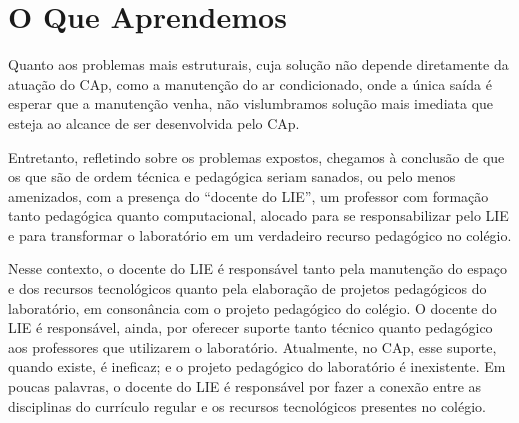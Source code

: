 \section{O Que Aprendemos}\label{sec:LABEL_CHP_REL_SEC_CONC}

Quanto aos problemas mais estruturais, cuja solução não depende diretamente da atuação do CAp, como a manutenção do ar condicionado, onde a única saída é esperar que a manutenção venha, não vislumbramos solução mais imediata que esteja ao alcance de ser desenvolvida pelo CAp.

Entretanto, refletindo sobre os problemas expostos, chegamos à conclusão de que os que são de ordem técnica e pedagógica seriam sanados, ou pelo menos amenizados, com a presença do “docente do LIE”, um professor com formação tanto pedagógica quanto computacional, alocado para se responsabilizar pelo LIE e para transformar o laboratório em um verdadeiro recurso pedagógico no colégio.

Nesse contexto, o docente do LIE é responsável tanto pela manutenção do espaço e dos recursos tecnológicos quanto pela elaboração de projetos pedagógicos do laboratório, em consonância com o projeto pedagógico do colégio. O docente do LIE é responsável, ainda, por oferecer suporte tanto técnico quanto pedagógico aos professores que utilizarem o laboratório. Atualmente, no CAp, esse suporte, quando existe, é ineficaz; e o projeto pedagógico do laboratório é inexistente. Em poucas palavras, o docente do LIE é responsável por fazer a conexão entre as disciplinas do currículo regular e os recursos tecnológicos presentes no colégio.
